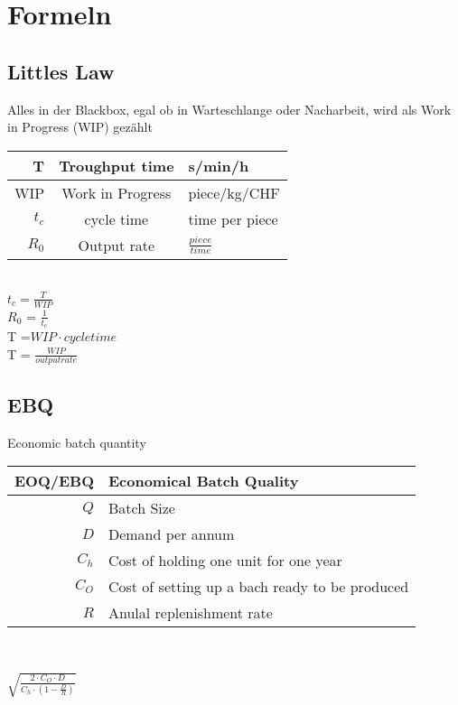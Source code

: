\section{Formeln}
\subsection{Little\textquotesingle{}s Law}
\begin{center}
	Alles in der Blackbox, egal ob in Warteschlange oder Nacharbeit, wird als Work in Progress (WIP) gez\"ahlt\\
	\begin{tabular}{|r|c|l|}
		\hline T  & Troughput time & s/min/h \\ 
		\hline WIP & Work in Progress & piece/kg/CHF \\ 
		\hline $t_c$ & cycle time & time per piece\\ 
		\hline $R_0$ & Output rate & $\frac{piece}{time}$\\
		\hline
	\end{tabular}
	\\\vspace{5 mm}
	$t_c=\frac{T}{WIP}$\\\vspace{2 mm}
	$R_0$ = $\frac{1}{t_c}$ \\\vspace{2 mm}
	T =$ WIP\cdot cycle time$ \\\vspace{2 mm}
	T = $\frac{WIP}{output rate}$\\\vspace{2 mm}
	
\end{center}
\subsection{EBQ}
Economic batch quantity\\
\begin{center}
	\begin{tabular}{|r|l|}
		\hline EOQ/EBQ  & Economical Batch Quality \\ 
		\hline $Q$  & Batch Size \\ 
		\hline $D$ & Demand per annum \\ 
		\hline $C_h$ & Cost of holding one unit for one year\\ 
		\hline $C_O$ & Cost of setting up a bach ready to be produced\\
		\hline $R$ & Anulal replenishment rate\\
		\hline
	\end{tabular}
	\\\vspace{5 mm}

$\sqrt{\frac{2 \cdot C_O \cdot D}{ C_h \cdot ( 1 -\frac{D}{R}  ) }}$
\end{center}
